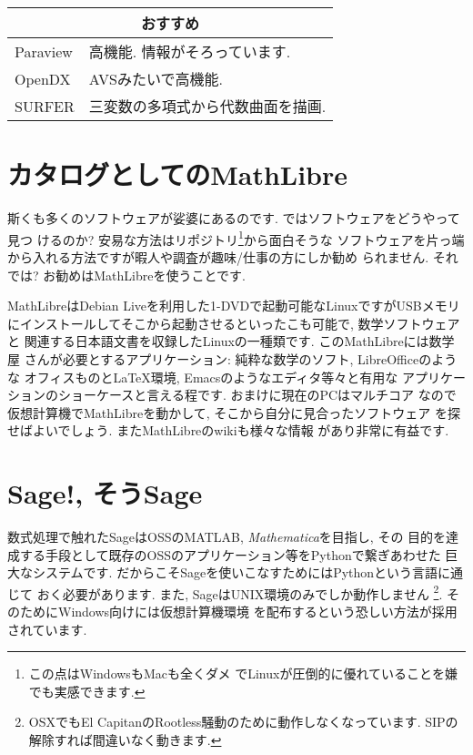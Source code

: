 \vspace{0.5cm}
{\footnotesize
\begin{tabularx}{8cm}{l X}
\multicolumn{2}{c}{おすすめ}\\\hline
Paraview& 高機能. 情報がそろっています.\\
OpenDX& AVSみたいで高機能.\\
SURFER& 三変数の多項式から代数曲面を描画.\\\hline
\end{tabularx}
}
\vspace{0.5cm}

\section{カタログとしてのMathLibre}

斯くも多くのソフトウェアが娑婆にあるのです. ではソフトウェアをどうやって見つ
けるのか? 安易な方法はリポジトリ\footnote{この点はWindowsもMacも全くダメ
でLinuxが圧倒的に優れていることを嫌でも実感できます.}から面白そうな
ソフトウェアを片っ端から入れる方法ですが暇人や調査が趣味/仕事の方にしか勧め
られません. それでは? お勧めはMathLibreを使うことです.
\newline

MathLibreはDebian Liveを利用した1-DVDで起動可能なLinuxですがUSBメモリ
にインストールしてそこから起動させるといったこも可能で, 数学ソフトウェアと
関連する日本語文書を収録したLinuxの一種類です. このMathLibreには数学屋
さんが必要とするアプリケーション: 純粋な数学のソフト, LibreOfficeのような
オフィスものと{\LaTeX}環境,  Emacsのようなエディタ等々と有用な
アプリケーションのショーケースと言える程です. おまけに現在のPCはマルチコア
なので仮想計算機でMathLibreを動かして, そこから自分に見合ったソフトウェア
を探せばよいでしょう. またMathLibre\cite{MathLibre}のwikiも様々な情報
があり非常に有益です.


\section{Sage!, そうSage}

数式処理で触れたSageはOSSのMATLAB, \textit{Mathematica}を目指し, その
目的を達成する手段として既存のOSSのアプリケーション等をPythonで繋ぎあわせた
巨大なシステムです. だからこそSageを使いこなすためにはPythonという言語に通じて
おく必要があります. また, SageはUNIX環境のみでしか動作しません
\footnote{OSXでもEl CapitanのRootless騒動のために動作しなくなっています.
 SIPの解除すれば間違いなく動きます.}. そのためにWindows向けには仮想計算機環境
を配布するという恐しい方法が採用されています.
\newline

